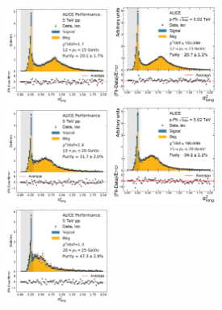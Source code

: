 \begin{figure}[h]
\center
\includegraphics[width=0.3\textwidth]{Data_Analysis/Purity/tf-example-pp-cluster_Lambda-12-15.pdf}
\includegraphics[width=0.3\textwidth]{Data_Analysis/Purity/tf-example-p-Pb-cluster_Lambda-12-15.pdf}
\\
\includegraphics[width=0.3\textwidth]{Data_Analysis/Purity/tf-example-pp-cluster_Lambda-15-20.pdf}
\includegraphics[width=0.3\textwidth]{Data_Analysis/Purity/tf-example-p-Pb-cluster_Lambda-15-20.pdf}
\\
\includegraphics[width=0.3\textwidth]{Data_Analysis/Purity/tf-example-pp-cluster_Lambda-20-25.pdf}

\end{figure}
